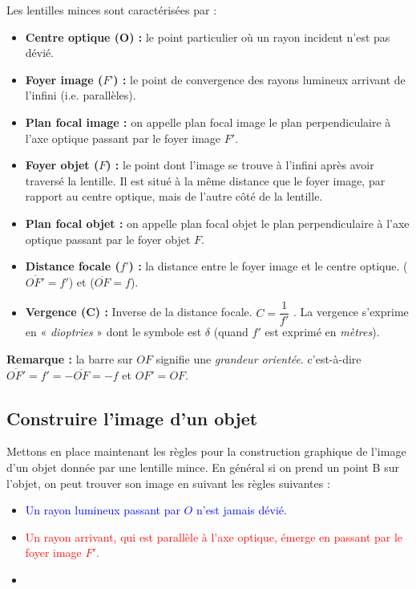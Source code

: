\documentclass[11pt,a4paper]{article}
\begin{document}
Les lentilles minces sont caractérisées par : 
\begin{itemize}
    \item \textbf{Centre optique (O) : }le point particulier où un rayon incident n’est pas dévié. 
    \item \textbf{Foyer image ($F’$) :} le point de convergence des rayons lumineux arrivant de l’infini (i.e. parallèles).
    \item \textbf{Plan focal image : } on appelle plan focal image le plan perpendiculaire à l'axe optique passant par le foyer image $F'$.
	\item \textbf{Foyer objet ($F$) :} le point dont l’image se trouve à l’infini après avoir traversé la lentille. Il est situé à la même distance que le foyer image, par rapport au centre optique, mais de l’autre côté de la lentille. 
	\item \textbf{Plan focal objet : }on appelle plan focal objet le plan perpendiculaire à l'axe optique passant par le foyer objet $F$.
	\item \textbf{Distance focale ($f’$) :} la distance entre le foyer image et le centre optique. ($\overline{OF'}=f'$) et ($\overline{OF}=f$). 
	\item \textbf{Vergence (C) :} Inverse de la distance focale. $C=\dfrac{1}{f'}$  .  La vergence s’exprime en « \textit{dioptries} » dont le symbole est $\delta$ (quand $f'$ est exprimé en \textit{mètres}). 
\end{itemize}
\begin{rmrq}
\textbf{Remarque :} la barre sur $OF$ signifie une \emph{grandeur orientée}. c'est-à-dire $\overline{OF'}=f'=-\overline{OF}=-f$ et $OF'=OF$. 
\end{rmrq}

\subsection{Construire l'image d'un objet}

Mettons en place maintenant les règles pour la construction graphique de l’image d’un objet donnée par une lentille mince.  En général si on prend un point B sur l’objet, on peut trouver son image en suivant les règles suivantes :
\begin{itemize}
    \item \textcolor{blue}{Un rayon lumineux passant par $O$ n’est jamais dévié}.
    \item \textcolor{red}{Un rayon arrivant, qui est parallèle à l’axe optique, émerge en passant par le foyer image $F'$.} 
    \item \color{Green}{Un rayon arrivant, en passant par le foyer objet $F$, émerge parallèle à l’axe optique.}  
\end{itemize}
\end{document}
